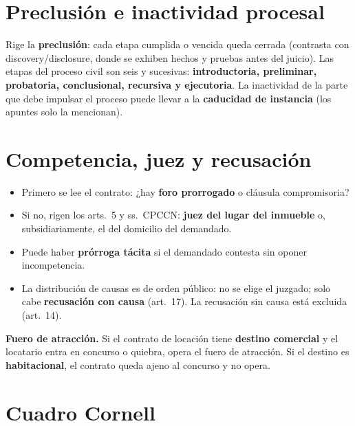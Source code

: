 \section{Preclusión e inactividad procesal}

Rige la \textbf{preclusión}: cada etapa cumplida o vencida queda cerrada (contrasta con discovery/disclosure, donde se exhiben hechos y pruebas antes del juicio). Las etapas del proceso civil son seis y sucesivas: \textbf{introductoria, preliminar, probatoria, conclusional, recursiva y ejecutoria}. La inactividad de la parte que debe impulsar el proceso puede llevar a la \textbf{caducidad de instancia} (los apuntes solo la mencionan).

\section{Competencia, juez y recusación}

\begin{itemize}
  \item Primero se lee el contrato: ¿hay \textbf{foro prorrogado} o cláusula compromisoria?
  \item Si no, rigen los arts.\ 5 y ss.\ CPCCN: \textbf{juez del lugar del inmueble} o, subsidiariamente, el del domicilio del demandado.
  \item Puede haber \textbf{prórroga tácita} si el demandado contesta sin oponer incompetencia.
  \item La distribución de causas es de orden público: no se elige el juzgado; solo cabe \textbf{recusación con causa} (art.\ 17). La recusación sin causa está excluida (art.\ 14).
\end{itemize}

\begin{important}
\textbf{Fuero de atracción.} Si el contrato de locación tiene \textbf{destino comercial} y el locatario entra en concurso o quiebra, opera el fuero de atracción. Si el destino es \textbf{habitacional}, el contrato queda ajeno al concurso y no opera.
\end{important}

\section{Cuadro Cornell}

